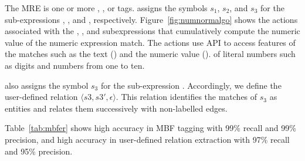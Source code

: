The  MRE 
 is one or more , , or  tags. 
\framework assigns the symbols $s_1$, $s_2$, and $s_3$ 
for the sub-expressions , , and , respectively. 
Figure~\ref{fig:numnormalgo} shows the actions associated with the 
, , and  subexpressions that cumulatively compute 
the numeric value of the numeric expression match.
The actions use \framework API to access features of the matches such 
as the text () and the numeric 
value (). 
of literal numbers such as digits and numbers from one to ten. 

\framework also assigns the symbol $s_3$ for the sub-expression . 
Accordingly, we define the user-defined relation $\langle s3,s3',\epsilon\rangle$. 
This relation identifies the matches of $s_3$ as entities and relates them successively with non-labelled edges.

Table~\ref{tab:mbfer} shows high accuracy in MBF tagging with 99\% recall and 99\% precision, and
high accuracy in user-defined relation extraction with 97\% recall and 95\% precision.
